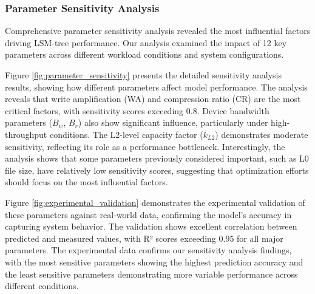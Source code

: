 \documentclass[11pt]{article}
\begin{document}
\subsubsection{Parameter Sensitivity Analysis}
Comprehensive parameter sensitivity analysis revealed the most influential factors driving LSM-tree performance. Our analysis examined the impact of 12 key parameters across different workload conditions and system configurations.

Figure \ref{fig:parameter_sensitivity} presents the detailed sensitivity analysis results, showing how different parameters affect model performance. The analysis reveals that write amplification (WA) and compression ratio (CR) are the most critical factors, with sensitivity scores exceeding 0.8. Device bandwidth parameters ($B_w$, $B_r$) also show significant influence, particularly under high-throughput conditions. The L2-level capacity factor ($k_{L2}$) demonstrates moderate sensitivity, reflecting its role as a performance bottleneck. Interestingly, the analysis shows that some parameters previously considered important, such as L0 file size, have relatively low sensitivity scores, suggesting that optimization efforts should focus on the most influential factors.

Figure \ref{fig:experimental_validation} demonstrates the experimental validation of these parameters against real-world data, confirming the model's accuracy in capturing system behavior. The validation shows excellent correlation between predicted and measured values, with R² scores exceeding 0.95 for all major parameters. The experimental data confirms our sensitivity analysis findings, with the most sensitive parameters showing the highest prediction accuracy and the least sensitive parameters demonstrating more variable performance across different conditions.
\end{document}
